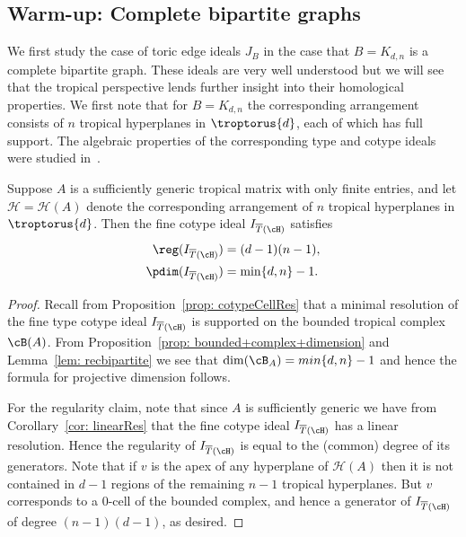 \subsection{Warm-up: Complete bipartite graphs}

We first study the case of toric edge ideals $J_B$ in the case that $B = K_{d,n}$ is a complete bipartite graph.  These ideals are very well understood but we will see that the tropical perspective lends further insight into their homological properties.  We first note that for $B =K_{d,n}$ the corresponding arrangement consists of $n$ tropical hyperplanes in $\troptorus{d}$, each of which has full support.  The algebraic properties of the corresponding type and cotype ideals were studied in~\cite{dochtermann2012tropical}.  

\begin{prop}\label{prop: completebipartite}
Suppose $A$ is a sufficiently generic tropical matrix with only finite entries, and let ${\mathcal H} = {\mathcal H}(A)$ denote the corresponding arrangement of $n$ tropical hyperplanes in $\troptorus{d}$. Then the fine cotype ideal $I_{\overline{T}(\cH)}$ satisfies
\begin{equation}
\begin{split}
\reg (I_{\overline{T}(\cH)})  & = (d-1)(n-1), \\
\pdim (I_{\overline{T}(\cH)}) & = \min\{d,n\} - 1.
\end{split}
\end{equation}
\end{prop}

\begin{proof}
Recall from Proposition~\ref{prop: cotypeCellRes} that a minimal resolution of the fine type cotype ideal $I_{\overline{T}(\cH)}$ is supported on the bounded tropical complex $\cB(A)$.  From Proposition~\ref{prop: bounded+complex+dimension} and Lemma~\ref{lem: recbipartite} we see that $\dim(\cB_A) =min\{d,n\} -1$ and hence the formula for projective dimension follows.

For the regularity claim, note that since $A$ is sufficiently generic we have from Corollary~\ref{cor: linearRes} that the fine cotype ideal $I_{\overline{T}(\cH)}$ has a linear resolution. 
Hence the regularity of $I_{\overline{T}(\cH)}$ is equal to the (common) degree of its generators.  
Note that if $v$ is the apex of any hyperplane of ${\mathcal H}(A)$ then it is not contained in $d-1$ regions of the remaining $n-1$ tropical hyperplanes.  But $v$ corresponds to a $0$-cell of the bounded complex, and hence a generator of $I_{\overline{T}(\cH)}$ of degree $(n-1)(d-1)$, as desired.
\end{proof}

